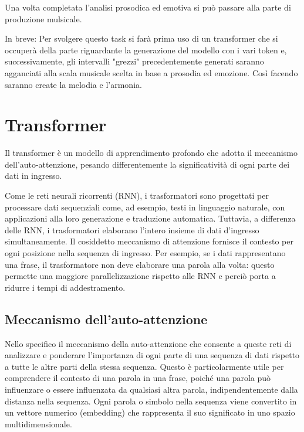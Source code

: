 Una volta completata l'analisi prosodica ed emotiva si può passare alla parte di produzione mulsicale.

In breve: Per svolgere questo task si farà prima uso di un transformer che si occuperà della parte riguardante la generazione del modello con i vari token e, successivamente, gli intervalli "grezzi" precedentemente generati saranno agganciati alla scala musicale scelta in base a prosodia ed emozione.
Così facendo saranno create la melodia e l'armonia.



\section{Transformer}
Il transformer è un modello di apprendimento profondo che adotta il meccanismo dell'auto-attenzione, pesando differentemente la significatività di ogni parte dei dati in ingresso. 

Come le reti neurali ricorrenti (RNN), i trasformatori sono progettati per processare dati sequenziali come, ad esempio, testi in linguaggio naturale, con applicazioni alla loro generazione e traduzione automatica. Tuttavia, a differenza delle RNN, i trasformatori elaborano l'intero insieme di dati d'ingresso simultaneamente. Il cosiddetto meccanismo di attenzione fornisce il contesto per ogni posizione nella sequenza di ingresso. Per esempio, se i dati rappresentano una frase, il trasformatore non deve elaborare una parola alla volta: questo permette una maggiore parallelizzazione rispetto alle RNN e perciò porta a ridurre i tempi di addestramento.


\subsection{Meccanismo dell'auto-attenzione}
Nello specifico il meccanismo della auto-attenzione che consente a queste reti di analizzare e ponderare l’importanza di ogni parte di una sequenza di dati rispetto a tutte le altre parti della stessa sequenza.
Questo è particolarmente utile per comprendere il contesto di una parola in una frase, poiché una parola può influenzare o essere influenzata da qualsiasi altra parola, indipendentemente dalla distanza nella sequenza. Ogni parola o simbolo nella sequenza viene convertito in un vettore numerico (embedding) che rappresenta il suo significato in uno spazio multidimensionale.


